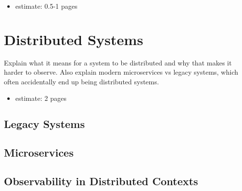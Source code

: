 \begin{itemize}
    \item estimate: 0.5-1 pages
\end{itemize}

\section{Distributed Systems}
\label{sec_b_distributed_systems}

Explain what it means for a system to be distributed and why that makes it harder to observe.
Also explain modern microservices vs legacy systems, which often accidentally end up being distributed systems.

\begin{itemize}
    \item estimate: 2 pages
\end{itemize}

\subsection{Legacy Systems}
\subsection{Microservices}
\subsection{Observability in Distributed Contexts}